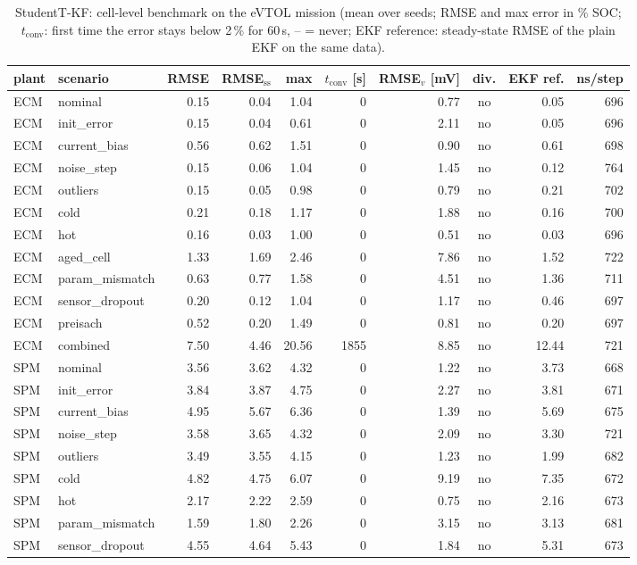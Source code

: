 \begin{table}[H]\centering\footnotesize\setlength{\tabcolsep}{4pt}
\caption{StudentT-KF: cell-level benchmark on the eVTOL mission (mean over seeds; RMSE and max error in \% SOC; $t_\mathrm{conv}$: first time the error stays below 2\,\% for 60\,s, -- = never; EKF reference: steady-state RMSE of the plain EKF on the same data).}\label{tab:cell_StudentTKF}
\begin{tabular}{llrrrrrcrr}\toprule
plant & scenario & RMSE & RMSE$_\mathrm{ss}$ & max & $t_\mathrm{conv}$ [s] & RMSE$_v$ [mV] & div. & EKF ref. & ns/step \\ \midrule
ECM & nominal & 0.15 & 0.04 & 1.04 & 0 & 0.77 & no & 0.05 & 696 \\
ECM & init\_error & 0.15 & 0.04 & 0.61 & 0 & 2.11 & no & 0.05 & 696 \\
ECM & current\_bias & 0.56 & 0.62 & 1.51 & 0 & 0.90 & no & 0.61 & 698 \\
ECM & noise\_step & 0.15 & 0.06 & 1.04 & 0 & 1.45 & no & 0.12 & 764 \\
ECM & outliers & 0.15 & 0.05 & 0.98 & 0 & 0.79 & no & 0.21 & 702 \\
ECM & cold & 0.21 & 0.18 & 1.17 & 0 & 1.88 & no & 0.16 & 700 \\
ECM & hot & 0.16 & 0.03 & 1.00 & 0 & 0.51 & no & 0.03 & 696 \\
ECM & aged\_cell & 1.33 & 1.69 & 2.46 & 0 & 7.86 & no & 1.52 & 722 \\
ECM & param\_mismatch & 0.63 & 0.77 & 1.58 & 0 & 4.51 & no & 1.36 & 711 \\
ECM & sensor\_dropout & 0.20 & 0.12 & 1.04 & 0 & 1.17 & no & 0.46 & 697 \\
ECM & preisach & 0.52 & 0.20 & 1.49 & 0 & 0.81 & no & 0.20 & 697 \\
ECM & combined & 7.50 & 4.46 & 20.56 & 1855 & 8.85 & no & 12.44 & 721 \\
\midrule
SPM & nominal & 3.56 & 3.62 & 4.32 & 0 & 1.22 & no & 3.73 & 668 \\
SPM & init\_error & 3.84 & 3.87 & 4.75 & 0 & 2.27 & no & 3.81 & 671 \\
SPM & current\_bias & 4.95 & 5.67 & 6.36 & 0 & 1.39 & no & 5.69 & 675 \\
SPM & noise\_step & 3.58 & 3.65 & 4.32 & 0 & 2.09 & no & 3.30 & 721 \\
SPM & outliers & 3.49 & 3.55 & 4.15 & 0 & 1.23 & no & 1.99 & 682 \\
SPM & cold & 4.82 & 4.75 & 6.07 & 0 & 9.19 & no & 7.35 & 672 \\
SPM & hot & 2.17 & 2.22 & 2.59 & 0 & 0.75 & no & 2.16 & 673 \\
SPM & param\_mismatch & 1.59 & 1.80 & 2.26 & 0 & 3.15 & no & 3.13 & 681 \\
SPM & sensor\_dropout & 4.55 & 4.64 & 5.43 & 0 & 1.84 & no & 5.31 & 673 \\
\bottomrule\end{tabular}\end{table}
